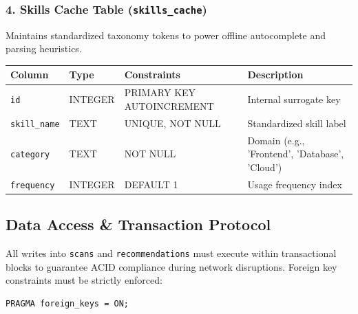 \subsubsection{4. Skills Cache Table (\texttt{skills\_cache})}
Maintains standardized taxonomy tokens to power offline autocomplete and parsing heuristics.
\begin{center}
\begin{tabular}{@{}llll@{}}
\toprule
\textbf{Column} & \textbf{Type} & \textbf{Constraints} & \textbf{Description} \\ \midrule
\texttt{id} & INTEGER & PRIMARY KEY AUTOINCREMENT & Internal surrogate key \\
\texttt{skill\_name} & TEXT & UNIQUE, NOT NULL & Standardized skill label \\
\texttt{category} & TEXT & NOT NULL & Domain (e.g., 'Frontend', 'Database', 'Cloud') \\
\texttt{frequency} & INTEGER & DEFAULT 1 & Usage frequency index \\ \bottomrule
\end{tabular}
\end{center}

\subsection{Data Access \& Transaction Protocol}
All writes into \texttt{scans} and \texttt{recommendations} must execute within transactional blocks to guarantee ACID compliance during network disruptions. Foreign key constraints must be strictly enforced:
\begin{verbatim}
PRAGMA foreign_keys = ON;
\end{verbatim}
